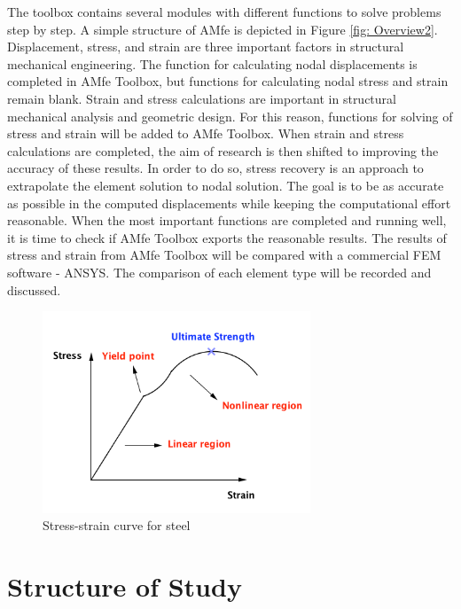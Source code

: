 The toolbox contains several modules with different functions to solve problems step by step. A simple structure of AMfe is depicted in Figure \ref{fig: Overview2}. Displacement, stress, and strain are three important factors in structural mechanical engineering. The function for calculating nodal displacements is completed in AMfe Toolbox, but functions for calculating nodal stress and strain remain blank. Strain and stress calculations are important in structural mechanical analysis and geometric design. For this reason, functions for solving of stress and strain will be added to AMfe Toolbox. When strain and stress calculations are completed, the aim of research is then shifted to improving the accuracy of these results. In order to do so, stress recovery is an approach to extrapolate the element solution to nodal solution. The goal is to be as accurate as possible in the computed displacements while keeping the computational effort reasonable. When the most important functions are completed and running well, it is time to check if AMfe Toolbox exports the reasonable results. The results of stress and strain from AMfe Toolbox will be compared with a commercial FEM software - ANSYS. The comparison of each element type will be recorded and discussed. 

\begin{figure}
	\begin{center}
		\includegraphics[width=8cm,clip]{nonlinear.pdf}			
		\caption{Stress-strain curve for steel} \label{fig: nonlinear}
	\end{center}
\end{figure}

\section{Structure of Study}

